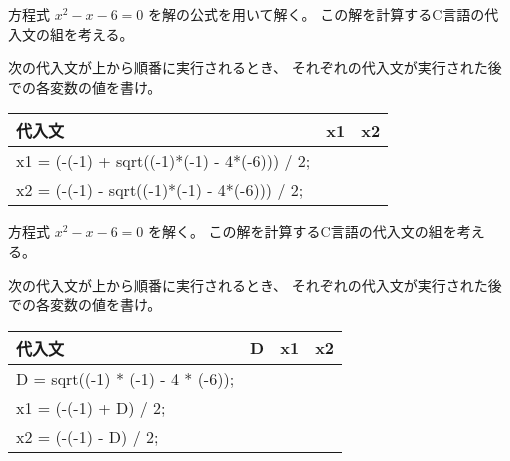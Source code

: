 \documentclass[12pt,a4j]{jarticle}
\newcounter{toi}
\def\toi{%
\bigskip\bigskip\noindent
\addtocounter{toi}{1}
\shadowbox{\bfseries\large 問\thetoi}
\nopagebreak[4]\bigskip\nopagebreak[4]
}
\begin{document}






\toi
\label{toi:quadricsolution}

方程式 $x^2 - x - 6 = 0$ を解の公式を用いて解く。
この解を計算するC言語の代入文の組を考える。

次の代入文が上から順番に実行されるとき、
それぞれの代入文が実行された後での各変数の値を書け。

\begin{center}
 \ttfamily%
 \begin{tabular}{|l|c|c|}\hline
 代入文 & x1 & x2\\ \hline\hline
 x1 = (-(-1) + sqrt((-1)*(-1) - 4*(-6))) / 2; & & \\  \cline{2-3}
 x2 = (-(-1) - sqrt((-1)*(-1) - 4*(-6))) / 2; & & \\  \hline
 \end{tabular}
\end{center}




\toi

方程式 $x^2 - x - 6 = 0$ を解く。
この解を計算するC言語の代入文の組を考える。

次の代入文が上から順番に実行されるとき、
それぞれの代入文が実行された後での各変数の値を書け。

\begin{center}
\ttfamily%
 \begin{tabular}{|l|c|c|c|}\hline
 代入文 & D & x1 & x2\\ \hline\hline
 D = sqrt((-1) * (-1) - 4 * (-6)); &  & & \\  \cline{2-4}
 x1 = (-(-1) + D) / 2; & &  & \\  \cline{2-4}
 x2 = (-(-1) - D) / 2; & &  & \\  \hline
 \end{tabular}
\end{center}
\end{document}
